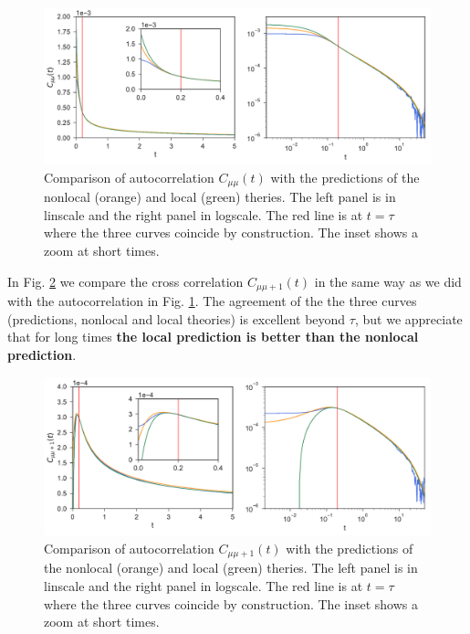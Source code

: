 \documentclass[b5paper,openright,11pt]{book}
\newcommand{\Note}[1]{{\bf \color{red}#1}}    %
\begin{document}
\begin{figure}[h!]
  \centering
\includegraphics[width=\linewidth]{Predictionsmumu-PBC}
\caption[Comparison of autocorrelation $C_{\mu\mu}$ with the predicions for PBC system]{Comparison of autocorrelation $C_{\mu\mu}(t)$ with the predictions of the nonlocal (orange) and local (green) theries. The left panel is in linscale and the right panel in logscale. The red line is at $t=\tau$ where the three curves coincide by construction. The inset shows a zoom at short times.}
\label{fig:Predictionsmumu-PBC}
\end{figure}

In Fig. \ref{fig:Predictionsmumu+1-PBC} we compare the cross correlation $C_{\mu\mu+1}(t)$ in the same way as we did with the autocorrelation in Fig. \ref{fig:Predictionsmumu-PBC}. The agreement of the the three curves (predictions, nonlocal and local theories) is excellent beyond $\tau$, but we appreciate that for long times \Note{the local prediction is better than the nonlocal prediction}. 

\begin{figure}[h!]
  \centering
\includegraphics[width=\linewidth]{Predictionsmumu+1-PBC}
\caption[Comparison of cross correlation $C_{\mu\mu+1}$ with the predicions for PBC system]{Comparison of autocorrelation $C_{\mu\mu+1}(t)$ with the predictions of the nonlocal (orange) and local (green) theries. The left panel is in linscale and the right panel in logscale. The red line is at $t=\tau$ where the three curves coincide by construction. The inset shows a zoom at short times.}
\label{fig:Predictionsmumu+1-PBC}
\end{figure}
\end{document}
